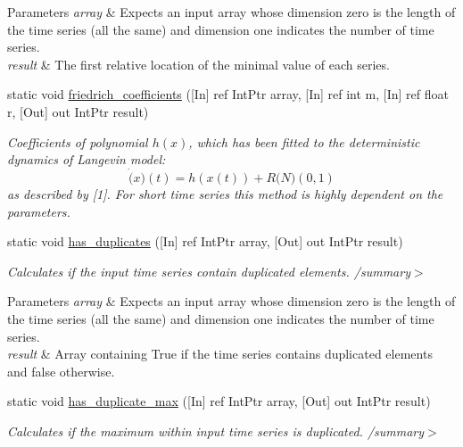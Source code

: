 \begin{DoxyCompactItemize}
\begin{DoxyCompactList}
\begin{DoxyParams}{Parameters}
{\em array} & Expects an input array whose dimension zero is the length of the time series (all the same) and dimension one indicates the number of time series.\\
\hline
{\em result} & The first relative location of the minimal value of each series.\\
\hline
\end{DoxyParams}
\end{DoxyCompactList}\item 
static void \mbox{\hyperlink{classkhiva_1_1interop_1_1_d_l_l_features_afd32548eecfa4ff70d1f98dbfe7ca53b}{friedrich\+\_\+coefficients}} (\mbox{[}In\mbox{]} ref Int\+Ptr array, \mbox{[}In\mbox{]} ref int m, \mbox{[}In\mbox{]} ref float r, \mbox{[}Out\mbox{]} out Int\+Ptr result)
\begin{DoxyCompactList}\small\item\em Coefficients of polynomial $h(x)$, which has been fitted to the deterministic dynamics of Langevin model\+: \[ \dot(x)(t) = h(x(t)) + R \mathcal(N)(0,1) \] as described by \mbox{[}1\mbox{]}. For short time series this method is highly dependent on the parameters. \end{DoxyCompactList}\item 
static void \mbox{\hyperlink{classkhiva_1_1interop_1_1_d_l_l_features_a574c813d82b8d022be812f54bc140788}{has\+\_\+duplicates}} (\mbox{[}In\mbox{]} ref Int\+Ptr array, \mbox{[}Out\mbox{]} out Int\+Ptr result)
\begin{DoxyCompactList}\small\item\em Calculates if the input time series contain duplicated elements. /summary$>$ 
\begin{DoxyParams}{Parameters}
{\em array} & Expects an input array whose dimension zero is the length of the time series (all the same) and dimension one indicates the number of time series.\\
\hline
{\em result} & Array containing True if the time series contains duplicated elements and false otherwise.\\
\hline
\end{DoxyParams}
\end{DoxyCompactList}\item 
static void \mbox{\hyperlink{classkhiva_1_1interop_1_1_d_l_l_features_a6ffb5faf3926fe75fb246f367b551cea}{has\+\_\+duplicate\+\_\+max}} (\mbox{[}In\mbox{]} ref Int\+Ptr array, \mbox{[}Out\mbox{]} out Int\+Ptr result)
\begin{DoxyCompactList}\small\item\em Calculates if the maximum within input time series is duplicated. /summary$>$ 

\end{DoxyCompactList}
\end{DoxyCompactItemize}
